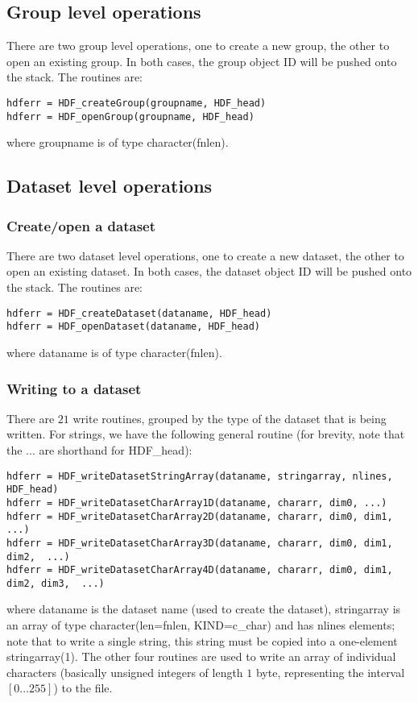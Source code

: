 \documentclass[DIV=calc, paper=letter, fontsize=11pt]{scrartcl}	 %
\begin{document}
\subsection{Group level operations}
There are two group level operations, one to create a new group, the other to open an existing group. In both cases, the group object ID will
be pushed onto the stack.  The routines are:
\begin{verbatim}
hdferr = HDF_createGroup(groupname, HDF_head)
hdferr = HDF_openGroup(groupname, HDF_head)
\end{verbatim}
where \textsf{groupname} is of type \textsf{character(fnlen)}.

\subsection{Dataset level operations}

\subsubsection{Create/open a dataset}
There are two dataset level operations, one to create a new dataset, the other to open an existing dataset. In both cases, the dataset object ID will
be pushed onto the stack.  The routines are:
\begin{verbatim}
hdferr = HDF_createDataset(dataname, HDF_head)
hdferr = HDF_openDataset(dataname, HDF_head)
\end{verbatim}
where \textsf{dataname} is of type \textsf{character(fnlen)}.

\subsubsection{Writing to a dataset}
There are $21$ write routines, grouped by the type of the dataset that is being written.
For strings, we have the following general routine (for brevity, note that the ... are shorthand for \textsf{HDF\_head}):
\begin{verbatim}
hdferr = HDF_writeDatasetStringArray(dataname, stringarray, nlines, HDF_head)
hdferr = HDF_writeDatasetCharArray1D(dataname, chararr, dim0, ...)
hdferr = HDF_writeDatasetCharArray2D(dataname, chararr, dim0, dim1,  ...)
hdferr = HDF_writeDatasetCharArray3D(dataname, chararr, dim0, dim1, dim2,  ...)
hdferr = HDF_writeDatasetCharArray4D(dataname, chararr, dim0, dim1, dim2, dim3,  ...)
\end{verbatim}
where \textsf{dataname} is the dataset name (used to create the dataset), \textsf{stringarray} 
is an array of type \textsf{character(len=fnlen, KIND=c\_char)} and has \textsf{nlines} elements; note
that to write a single string, this string must be copied into a one-element stringarray(1). The other
four routines are used to write an array of individual characters (basically unsigned integers of length
$1$ byte, representing the interval $[0\ldots 255]$) to the file.
\end{document}
